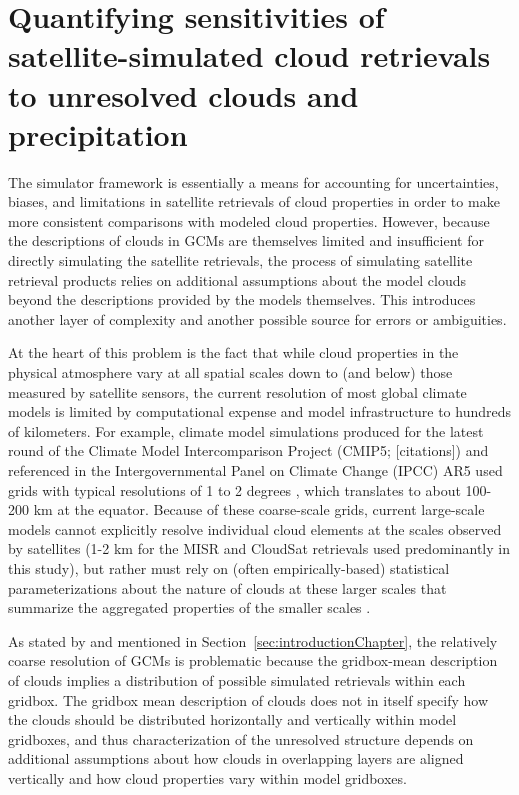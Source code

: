 \chapter{Quantifying sensitivities of satellite-simulated cloud
retrievals to unresolved clouds and precipitation}\label{sec:subgrid1}

The simulator framework is essentially a means for accounting for
uncertainties, biases, and limitations in satellite retrievals of cloud
properties in order to make more consistent comparisons with modeled
cloud properties. However, because the descriptions of clouds in GCMs
are themselves limited and insufficient for directly simulating the
satellite retrievals, the process of simulating satellite retrieval
products relies on additional assumptions about the model clouds beyond
the descriptions provided by the models themselves. This introduces
another layer of complexity and another possible source for errors or
ambiguities.

At the heart of this problem is the fact that while cloud properties in
the physical atmosphere vary at all spatial scales down to (and below)
those measured by satellite sensors, the current resolution of most
global climate models is limited by computational expense and model
infrastructure to hundreds of kilometers. For example, climate model
simulations produced for the latest round of the Climate Model
Intercomparison Project (CMIP5; {[}citations{]}) and referenced in the
Intergovernmental Panel on Climate Change (IPCC) AR5 used grids with
typical resolutions of 1 to 2 degrees \citep{flato_et_al_2013}, which
translates to about 100-200 km at the equator. Because of these
coarse-scale grids, current large-scale models cannot explicitly resolve
individual cloud elements at the scales observed by satellites (1-2 km
for the MISR and CloudSat retrievals used predominantly in this study),
but rather must rely on (often empirically-based) statistical
parameterizations about the nature of clouds at these larger scales that
summarize the aggregated properties of the smaller scales
\citep{randall_et_al_2003}.

As stated by \citet{pincus_et_al_2012} and mentioned in
Section~\ref{sec:introductionChapter}, the relatively coarse resolution
of GCMs is problematic because the gridbox-mean description of clouds
implies a distribution of possible simulated retrievals within each
gridbox. The gridbox mean description of clouds does not in itself
specify how the clouds should be distributed horizontally and vertically
within model gridboxes, and thus characterization of the unresolved
structure depends on additional assumptions about how clouds in
overlapping layers are aligned vertically and how cloud properties vary
within model gridboxes.

